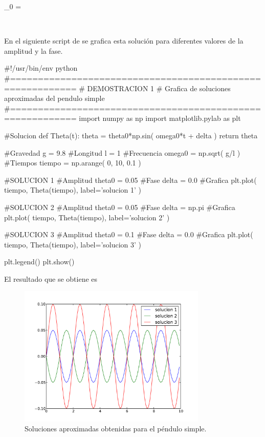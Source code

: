 { \omega_0 =  }

\

En el siguiente script de \python se grafica esta solución para diferentes
valores de la amplitud y la fase.

\newpage
\begin{listing}[style=python]
#!/usr/bin/env python
#==========================================================
# DEMOSTRACION 1
# Grafica de soluciones aproximadas del pendulo simple
#==========================================================
import numpy as np
import matplotlib.pylab as plt

#Solucion
def Theta(t):
    theta = theta0*np.sin( omega0*t + delta )
    return theta
    
#Gravedad
g = 9.8
#Longitud
l = 1
#Frecuencia
omega0 = np.sqrt( g/l )
#Tiempos
tiempo = np.arange( 0, 10, 0.1 )
    
#SOLUCION 1
#Amplitud
theta0 = 0.05
#Fase
delta = 0.0
#Grafica
plt.plot( tiempo, Theta(tiempo), label='solucion 1' )

#SOLUCION 2
#Amplitud
theta0 = 0.05
#Fase
delta = np.pi
#Grafica
plt.plot( tiempo, Theta(tiempo), label='solucion 2' )

#SOLUCION 3
#Amplitud
theta0 = 0.1
#Fase
delta = 0.0
#Grafica
plt.plot( tiempo, Theta(tiempo), label='solucion 3' )

plt.legend()
plt.show()
\end{listing}


El resultado que se obtiene es


\begin{figure}[htbp]
	\centering
	\includegraphics[width=0.8\textwidth]
	{./pictures/demo2_01.pdf}

	\caption{\small{Soluciones aproximadas obtenidas para el péndulo simple.}}
	
	\label{fig:approx_pedulum}
\end{figure}


